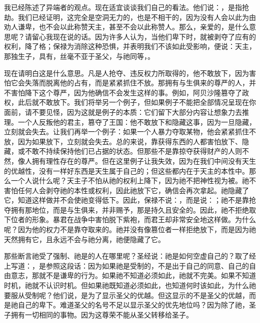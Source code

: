 我已经陈述了异端者的观点。现在适宜谈谈我们自己的看法。他们说：，是指抢劫。我们已经证明，这完全是空洞无力的，也是不相干的，因为没有人会以此为由劝人谦卑，也不会以此称赞天主，甚至不会以此称赞人。那么，亲爱的，是什么意思呢？请留心我现在说的话。因为许多人认为，当他们卑下时，就被剥夺了应有的权利，降了格；保禄为消除这种恐惧，并表明我们不该如此受影响，便说：天主，那独生子，具有，丝毫不亚于圣父，与祂同等，。\par

现在请明白这是什么意思。凡是人抢夺、违反权力所取得的，他不敢放下，因为害怕它会失落而脱离他的占有，而是紧紧抓住不放。那拥有与生俱来的尊严的人，并不害怕降下这个尊严，因为他确信不会发生这样的事。例如，阿贝沙隆篡夺了政权，此后就不敢放下。我们将举另一个例子，但如果例子不能把全部情况呈现在你面前，请不要见怪，因为这就是例子的本质：它们留下大部分内容让想象力去推理。一个人反叛他的君主，篡夺了王国：他不敢放下和隐藏这事，因为一旦隐藏，立刻就会失去。让我们再举一个例子：如果一个人暴力夺取某物，他会紧紧抓住不放，因为如果放下，立刻就会失去。总的来说，靠获得东西的人都害怕放下、隐藏，或不敢不持续保持他们已占据的状态。但那些不是靠掠夺获得财产的人则不然，像人拥有理性存在的尊严。但在这里例子让我失效，因为在我们中间没有天生的优越性，没有一样好东西是天生属于自己的；但这些都内在于天主的本性中。那么一个人说什么呢？天主子不怕从祂的权利上降下，因为祂不把神性视为被。祂不害怕任何人会剥夺祂的本性或权利，因此祂放下它，确信会再次拿起。祂隐藏了它，知道这样做并不会使祂变得低下。因此，保禄不说：，而是说：；祂不是靠抢夺拥有那地位，而是与生俱来，并非赐予，那是持久且安全的。因此，祂不拒绝取下位者的形象。暴君在战争中害怕脱下紫袍，而君王却非常安全地这样做。为什么呢？因为他的权力不是靠夺取来的。祂并没有像篡位者一样拒绝放下，而是因为祂天然拥有它，且永远不会与祂分离，祂便隐藏了它。\par

那些断言祂受了强制、祂是的人在哪里呢？圣经说：祂是如何空虚自己的？取了经上写道：，是参照这段话：因为如果祂是受制的，不是出于自己的同意、自己的自由意志，那就不是谦卑的行为。如果祂不知道必须如此，祂就不完美。如果不知道时机，祂就不认识时机。但如果祂既知道必须如此，也知道何时该如此，为什么祂要服从受制呢？他们说，是为了显示圣父的优越。但这显示的不是圣父的优越，而是祂自己的卑下。难道圣父的名号不足以显示圣父的优先地位吗？因为除了祂，圣子拥有一切相同的事物。因为这尊荣不能从圣父转移给圣子。\par

